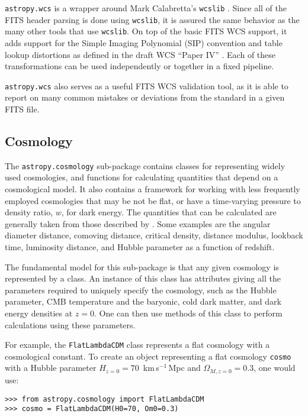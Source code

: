 \documentclass[traditabstract]{aa}
\begin{document}
\texttt{astropy.wcs} is a wrapper around Mark Calabretta's
\texttt{wcslib} \citep{calabretta2013wcslib}.  Since all of the FITS
header parsing is done using \texttt{wcslib}, it is assured the same
behavior as the many other tools that use \texttt{wcslib}.  On top of
the basic FITS WCS support, it adds support for the Simple Imaging
Polynomial (SIP) convention and table lookup distortions as defined in
the draft WCS ``Paper IV'' \citep{calabretta2004wcs}.  Each of these
transformations can be used independently or together in a fixed
pipeline.

\texttt{astropy.wcs} also serves as a useful FITS WCS validation tool,
as it is able to report on many common mistakes or deviations from the
standard in a given FITS file.

\subsection{Cosmology}


The \texttt{astropy.cosmology} sub-package contains classes for
representing widely used cosmologies, and functions for calculating
quantities that depend on a cosmological model. It also contains a
framework for working with less frequently employed cosmologies that
may be not be flat, or have a time-varying pressure to density ratio,
$w$, for dark energy. The quantities that can be calculated are
generally taken from those described by \citet{Hogg99}. Some examples
are the angular diameter distance, comoving distance, critical
density, distance modulus, lookback time, luminosity distance, and
Hubble parameter as a function of redshift.

The fundamental model for this sub-package is that any given cosmology
is represented by a class. An instance of this class has attributes
giving all the parameters required to uniquely specify the cosmology,
such as the Hubble parameter, CMB temperature and the baryonic, cold
dark matter, and dark energy densities at $z=0$. One can then use
methods of this class to perform calculations using these parameters.

For example, the \texttt{FlatLambdaCDM} class represents a flat
cosmology with a cosmological constant. To create an object
representing a flat cosmology \texttt{cosmo} with a Hubble parameter
$H_{z=0} = 70$~km\,s$^{-1}$\,Mpc and $\Omega_{M,z=0} = 0.3$, one would
use:

\begin{verbatim}
>>> from astropy.cosmology import FlatLambdaCDM
>>> cosmo = FlatLambdaCDM(H0=70, Om0=0.3)
\end{verbatim}
\end{document}
